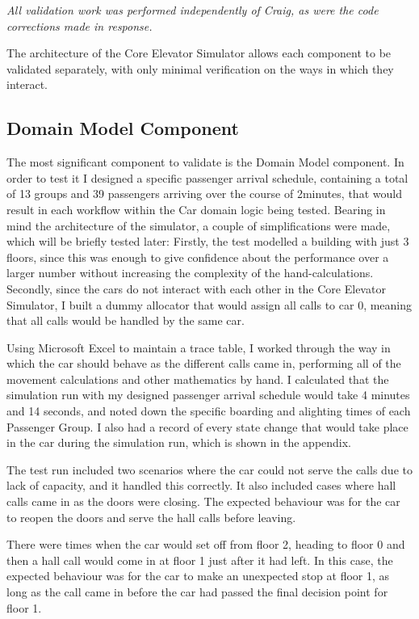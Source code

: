 \documentclass{UoYCSproject}
\begin{document}
\textit{All validation work was performed independently of Craig, as were the code corrections made in response.}

The architecture of the Core Elevator Simulator allows each component to be validated separately, with only minimal verification on the ways in which they interact.

\subsection{Domain Model Component}

The most significant component to validate is the Domain Model component.  In order to test it I designed a specific passenger arrival schedule, containing a total of 13 groups and 39 passengers arriving over the course of 2\textonehalf minutes, that would result in each workflow within the Car domain logic being tested.  Bearing in mind the architecture of the simulator, a couple of simplifications were made, which will be briefly tested later:  Firstly, the test modelled a building with just 3 floors, since this was enough to give confidence about the performance over a larger number without increasing the complexity of the hand-calculations.  Secondly, since the cars do not interact with each other in the Core Elevator Simulator, I built a dummy allocator that would assign all calls to car 0, meaning that all calls would be handled by the same car.

Using Microsoft Excel to maintain a trace table, I worked through the way in which the car should behave as the different calls came in, performing all of the movement calculations and other mathematics by hand.  I calculated that the simulation run with my designed passenger arrival schedule would take 4 minutes and 14 seconds, and noted down the specific boarding and alighting times of each Passenger Group.  I also had a record of every state change that would take place in the car during the simulation run, which is shown in the appendix.

The test run included two scenarios where the car could not serve the calls due to lack of capacity, and it handled this correctly.  It also included cases where hall calls came in as the doors were closing.  The expected behaviour was for the car to reopen the doors and serve the hall calls before leaving.

There were times when the car would set off from floor 2, heading to floor 0 and then a hall call would come in at floor 1 just after it had left.  In this case, the expected behaviour was for the car to make an unexpected stop at floor 1, as long as the call came in before the car had passed the final decision point for floor 1.
\end{document}
